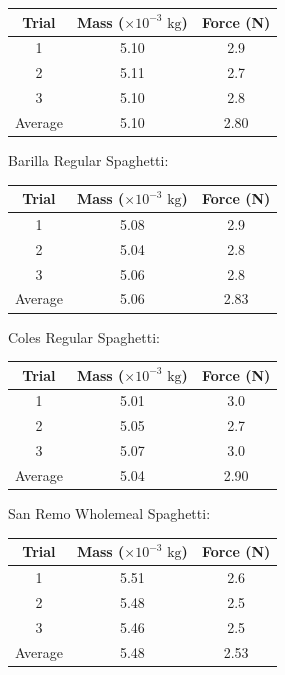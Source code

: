 \documentclass[a4paper,11pt]{article}
\begin{document}
\begin{center}
\begin{tabular}{|c|c|c|}
\hline
Trial & Mass ($\times 10^{-3}\mbox{ kg}$) & Force (N) \\
\hline
1       & 5.10 & 2.9 \\
2       & 5.11 & 2.7 \\
3       & 5.10 & 2.8 \\
\hline
Average & 5.10 & 2.80 \\
\hline
\end{tabular}
\end{center}

Barilla Regular Spaghetti:

\begin{center}
\begin{tabular}{|c|c|c|}
\hline
Trial & Mass ($\times 10^{-3}\mbox{ kg}$) & Force (N) \\
\hline
1       & 5.08 & 2.9 \\
2       & 5.04 & 2.8 \\
3       & 5.06 & 2.8 \\
\hline
Average & 5.06 & 2.83 \\
\hline
\end{tabular}
\end{center}

Coles Regular Spaghetti:

\begin{center}
\begin{tabular}{|c|c|c|}
\hline
Trial & Mass ($\times 10^{-3}\mbox{ kg}$) & Force (N) \\
\hline
1       & 5.01 & 3.0 \\
2       & 5.05 & 2.7 \\
3       & 5.07 & 3.0 \\
\hline
Average & 5.04 & 2.90 \\
\hline
\end{tabular}
\end{center}

San Remo Wholemeal Spaghetti:

\begin{center}
\begin{tabular}{|c|c|c|}
\hline
Trial & Mass ($\times 10^{-3}\mbox{ kg}$) & Force (N) \\
\hline
1       & 5.51 & 2.6 \\
2       & 5.48 & 2.5 \\
3       & 5.46 & 2.5 \\
\hline
Average & 5.48 & 2.53 \\
\hline
\end{tabular}
\end{center}
\end{document}
